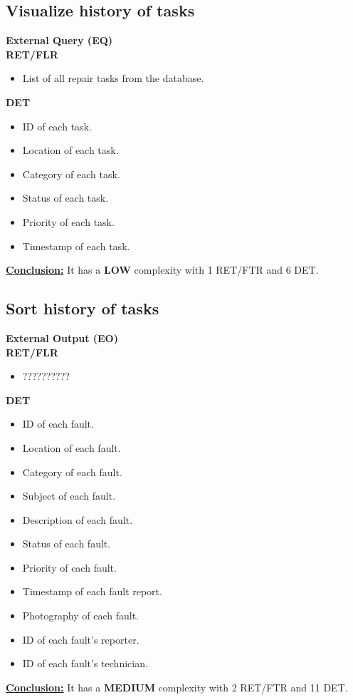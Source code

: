 \subsection{Visualize history of tasks}
\textbf{External Query (EQ)} \\ 
\textbf{RET/FLR}
\begin{itemize}
\item List of all repair tasks from the database.
\end{itemize}
\textbf{DET}
\begin{itemize}
\item ID of each task.
\item Location of each task.
\item Category of each task.
\item Status of each task.
\item Priority of each task.
\item Timestamp of each task.
\end{itemize}
\textbf{\underline{Conclusion:}} It has a \textbf{LOW} complexity with 1 RET/FTR and 6 DET.

\subsection{Sort history of tasks}
\textbf{External Output (EO)} \\ 
\textbf{RET/FLR}
\begin{itemize}
\item ??????????
\end{itemize}
\textbf{DET}
\begin{itemize}
\item ID of each fault.
\item Location of each fault.
\item Category of each fault.
\item Subject of each fault.
\item Description of each fault.
\item Status of each fault.
\item Priority of each fault.
\item Timestamp of each fault report.
\item Photography of each fault.
\item ID of each fault's reporter.
\item ID of each fault's technician.
\end{itemize}
\textbf{\underline{Conclusion:}} It has a \textbf{MEDIUM} complexity with 2 RET/FTR and 11 DET.

